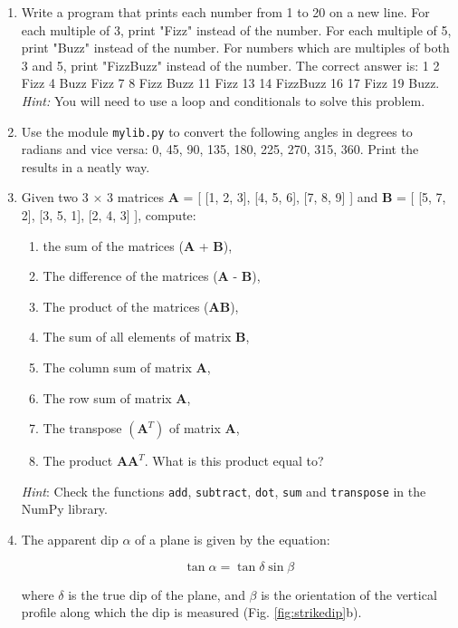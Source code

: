 \documentclass[a4paper , 12pt]{book}
\newcommand{\code}[1]{\colorbox{light-gray}{\texttt{#1}}}
\begin{document}
\begin{enumerate}
    \item Write a program that prints each number from 1 to 20 on a new line. For each multiple of 3, print "Fizz" instead of the number. For each multiple of 5, print "Buzz" instead of the number. For numbers which are multiples of both 3 and 5, print "FizzBuzz" instead of the number. The correct answer is: 1 2 Fizz 4 Buzz Fizz 7 8 Fizz Buzz 11 Fizz 13 14 FizzBuzz 16 17 Fizz 19 Buzz. \textit{Hint:} You will need to use a loop and conditionals to solve this problem.
    
    \item Use the module \code{mylib.py} to convert the following angles in degrees to radians and vice versa: 0, 45, 90, 135, 180, 225, 270, 315, 360. Print the results in a neatly way.
    
    \item Given two 3 $\times$ 3 matrices \textbf{A} = [ [1, 2, 3], [4, 5, 6], [7, 8, 9] ] and \textbf{B} = [ [5, 7, 2], [3, 5, 1], [2, 4, 3] ], compute: 
    \begin{enumerate}
    \item  the sum of the matrices (\textbf{A} + \textbf{B}), 
    \item  The difference of the matrices (\textbf{A} - \textbf{B}), 
    \item  The product of the matrices (\textbf{AB}), 
    \item  The sum of all elements of matrix \textbf{B}, 
    \item  The column sum of matrix \textbf{A}, 
    \item  The row sum of matrix \textbf{A}, 
    \item  The transpose $(\textbf{A}^T)$ of matrix \textbf{A}, 
    \item  The product $\textbf{AA}^T$. What is this product equal to?
    \end{enumerate} 
    
    \textit{Hint}: Check the functions \code{add}, \code{subtract}, \code{dot}, \code{sum} and \code{transpose} in the NumPy library. 
    
    \item The apparent dip $\alpha$ of a plane is given by the equation:
    
    \begin{equation}
        \tan\alpha=\tan\delta\sin\beta
    \end{equation}
    
    where $\delta$ is the true dip of the plane, and $\beta$ is the orientation of the vertical profile along which the dip is measured (Fig. \ref{fig:strikedip}b). 
    

\end{enumerate}
\end{document}
